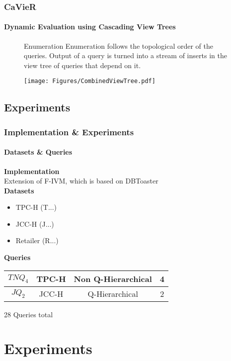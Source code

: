 \documentclass[
	11pt, %
]{beamer}
\begin{document}
\begin{frame}
	\frametitle{CaVieR}
	\framesubtitle{Dynamic Evaluation using Cascading View Trees}
	\begin{figure}
		\begin{minipage}{0.5\textwidth}
		\begin{block}{Enumeration}
			Enumeration follows the topological order of the queries. Output of a query is turned into a stream of inserts in the view tree of queries that depend on it.
		\end{block}
		\end{minipage}
		\begin{minipage}{0.49\textwidth}
			\vspace{-0.8cm}
			\texttt{[image: Figures/CombinedViewTree.pdf]}
		\end{minipage}
	\end{figure}
\end{frame}

\subsection{Experiments}
\begin{frame}
	\frametitle{Implementation \& Experiments}
	\framesubtitle{Datasets \& Queries}
	\textbf{Implementation}\\
	Extension of F-IVM, which is based on DBToaster\\
	\vspace{0.1cm}
	\textbf{Datasets}
	\begin{itemize}
		\item TPC-H	  (T...)
		\item JCC-H   (J...)
		\item Retailer  (R...)
	\end{itemize}
	\vspace{1em}
	\textbf{Queries}\\
	\vspace{0.5em}
	\begin{tabular}{c!{\vrule width 2pt}c|c|c}
		$TNQ_4$ & TPC-H & Non Q-Hierarchical  & 4 \rule{0pt}{2.5ex}\\
		\hline \rule{0pt}{2.5ex}
		$JQ_2$ & JCC-H & Q-Hierarchical & 2 \\
	\end{tabular}
	
	\vspace{1em}
	28 Queries total
\end{frame}

\section{Experiments}
\end{document}
